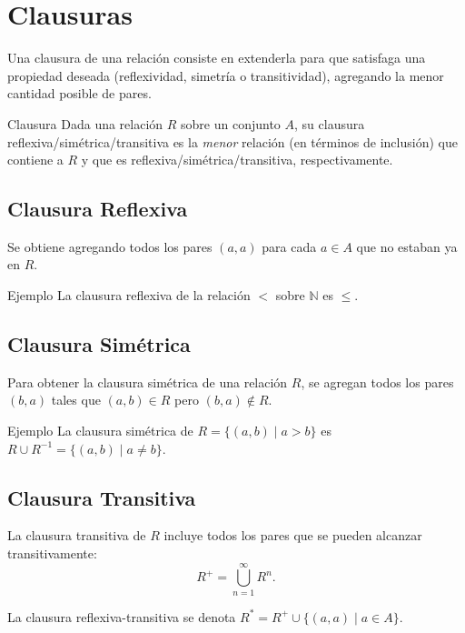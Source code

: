 \section{Clausuras}

Una clausura de una relaci\'on consiste en extenderla para que satisfaga una propiedad deseada (reflexividad, simetr\'ia o transitividad), agregando la menor cantidad posible de pares.

\begin{definitionblock}{Clausura}
Dada una relaci\'on $R$ sobre un conjunto $A$, su clausura reflexiva/sim\'etrica/transitiva es la \emph{menor} relaci\'on (en t\'erminos de inclusi\'on) que contiene a $R$ y que es reflexiva/sim\'etrica/transitiva, respectivamente.
\end{definitionblock}

\subsection{Clausura Reflexiva}

Se obtiene agregando todos los pares $(a,a)$ para cada $a \in A$ que no estaban ya en $R$.

\begin{exampleblock}{Ejemplo}
La clausura reflexiva de la relaci\'on $<$ sobre $\mathbb{N}$ es $\leq$.
\end{exampleblock}

\subsection{Clausura Sim\'etrica}

Para obtener la clausura sim\'etrica de una relaci\'on $R$, se agregan todos los pares $(b,a)$ tales que $(a,b) \in R$ pero $(b,a) \not\in R$.

\begin{exampleblock}{Ejemplo}
La clausura sim\'etrica de $R = \{(a,b) \mid a > b\}$ es $R \cup R^{-1} = \{(a,b) \mid a \neq b\}$.
\end{exampleblock}

\subsection{Clausura Transitiva}

La clausura transitiva de $R$ incluye todos los pares que se pueden alcanzar transitivamente:
\[ R^+ = \bigcup_{n=1}^{\infty} R^n. \]

La clausura reflexiva-transitiva se denota $R^* = R^+ \cup \{(a,a) \mid a \in A\}$.

